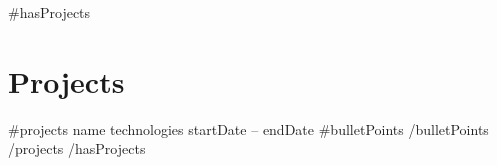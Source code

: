 {{#hasProjects}}
\section{Projects}
\resumeSubHeadingListStart
  {{#projects}}
  \resumeProjectHeading
    { {{name}} }
    { {{{technologies}}} }
    { {{startDate}} -- {{endDate}} }
  \resumeItemListStart
    {{#bulletPoints}}
    {{/bulletPoints}}
  \resumeItemListEnd
  {{/projects}}
\resumeSubHeadingListEnd
{{/hasProjects}}
